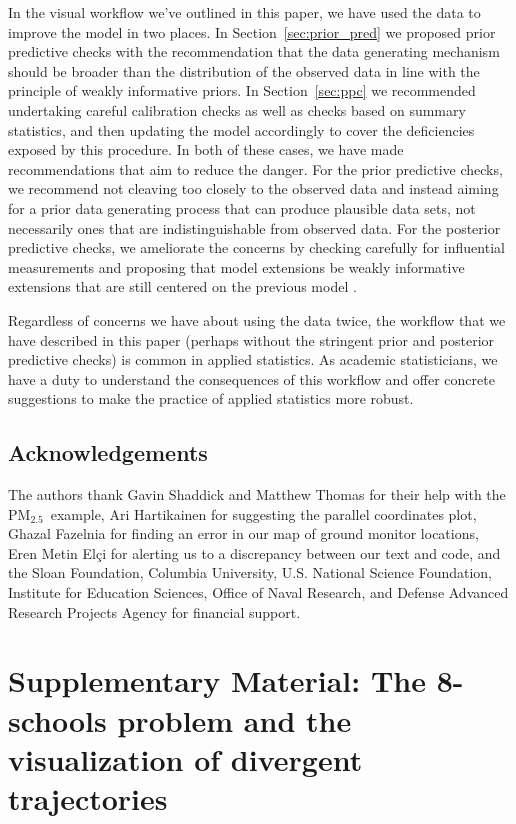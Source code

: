 \documentclass{statsoc}
\newcommand{\PM}{PM$_{2.5}$}
\begin{document}
In the visual workflow we've outlined in this paper, we have used the data to
improve the model in two places. In Section~\ref{sec:prior_pred} we proposed
prior predictive checks with the recommendation that the data generating
mechanism should be broader than the distribution of the observed data in line
with the principle of weakly informative priors. In Section~\ref{sec:ppc} we
recommended undertaking careful calibration checks as well as checks based on
summary statistics, and then updating the model accordingly to cover the
deficiencies exposed by this procedure. In both of these cases, we have made
recommendations that aim to reduce the danger. For the prior predictive checks,
we recommend not cleaving too closely to the observed data and instead aiming
for a prior data generating process that can produce plausible data sets, not
necessarily ones that are indistinguishable from observed data. For the
posterior predictive checks, we ameliorate the concerns by checking carefully
for influential measurements and proposing that model extensions be weakly
informative extensions that are still centered on the previous model
\citep{simpson2017penalising}.

Regardless of concerns we have about using the data twice, the workflow that we
have described in this paper (perhaps without the stringent prior and posterior
predictive checks) is common in applied statistics. As academic statisticians,
we have a duty to understand the consequences of this workflow and offer
concrete suggestions to make the practice of applied statistics more robust.

\subsection*{Acknowledgements}

The authors thank Gavin Shaddick and Matthew Thomas for their help with the \PM\
example, Ari Hartikainen for suggesting the parallel coordinates plot,
Ghazal Fazelnia for finding an error in our map of ground monitor locations,
Eren Metin El\c{c}i for alerting us to a discrepancy between our text and code,
and the Sloan Foundation, Columbia University, U.S. National Science Foundation,
Institute for Education Sciences, Office of Naval Research, and 
Defense Advanced Research Projects Agency for financial support.







\clearpage
\section*{Supplementary Material: The 8-schools problem and the visualization of divergent trajectories}
\end{document}
